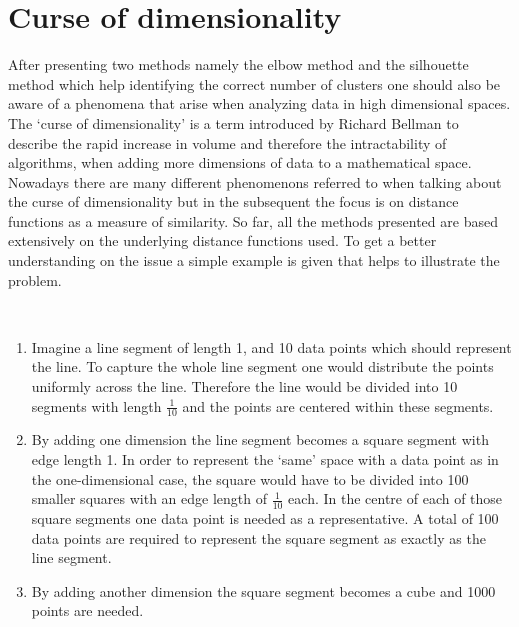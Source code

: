 \section{Curse of dimensionality}
After presenting two methods namely the elbow method and the silhouette method which help identifying the correct number of clusters one should also be aware of a phenomena that arise when analyzing data in high dimensional spaces. The `curse of dimensionality' is a term introduced by Richard Bellman \cite{bellman1961adaptive} to describe the rapid increase in volume and therefore the intractability of algorithms, when adding more dimensions of data to a mathematical space. Nowadays there are many different phenomenons referred to when talking about the curse of dimensionality but in the subsequent the focus is on distance functions as a measure of similarity. So far, all the methods presented are based extensively on the underlying distance functions used. To get a better understanding on the issue a simple example is given that helps to illustrate the problem.

\begin{example}\label{ex:curse_of_dimensionality}~
	\begin{enumerate}[label=(\roman*)]
		\item Imagine a line segment of length 1, and 10 data points which should represent the line. To capture the whole line segment one would distribute the points uniformly across the line. Therefore the line would be divided into 10 segments with length $\frac{1}{10}$ and the points are centered within these segments.
		\item By adding one dimension the line segment becomes a square segment with edge length 1. In order to represent the `same' space with a data point as in the one-dimensional case, the square would have to be divided into 100 smaller squares with an edge length of $\frac{1}{10}$ each. In the centre of each of those square segments one data point is needed as a representative. A total of 100 data points are required to represent the square segment as exactly as the line segment. 
		\item By adding another dimension the square segment becomes a cube and 1000 points are needed. 
	\end{enumerate}
\end{example}

